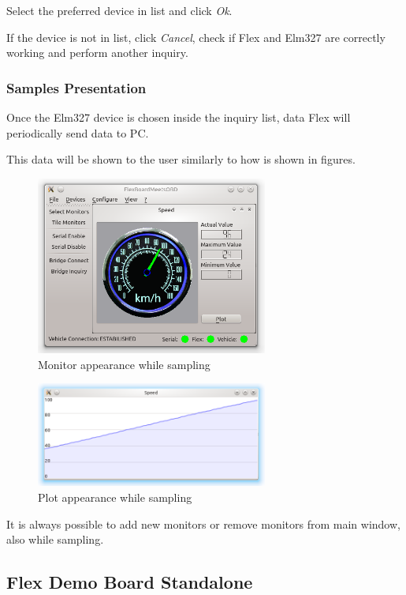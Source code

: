 \documentclass[twoside]{article}
\begin{document}
\begin{multicols}{2}
Select the preferred device in list and click \emph{Ok}.

If the device is not in list, click \emph{Cancel}, check if Flex and Elm327 are correctly working and perform another inquiry.

\subsubsection{Samples Presentation}

Once the Elm327 device is chosen inside the inquiry list, data Flex will periodically send data to PC.

This data will be shown to the user similarly to how is shown in figures.

\begin{figure}[H]
  \centering
  \includegraphics[width=3in]{img/GUI/sampling_monitor}
  \caption{Monitor appearance while sampling}
\end{figure}

\begin{figure}[H]
  \centering
  \includegraphics[width=3in]{img/GUI/sampling_plot}
  \caption{Plot appearance while sampling}
\end{figure}

It is always possible to add new monitors or remove monitors from main window, also while sampling.

\subsection{Flex Demo Board Standalone}


\end{multicols}
\end{document}
